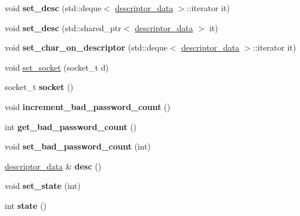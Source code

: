 \begin{DoxyCompactItemize}
void {\bfseries set\+\_\+desc} (std\+::deque$<$ \hyperlink{structmods_1_1descriptor__data}{descriptor\+\_\+data} $>$\+::iterator it)
\item 
\mbox{\label{classmods_1_1player_a573f41de9bcd357412059bf016ebde78}} 
void {\bfseries set\+\_\+desc} (std\+::shared\+\_\+ptr$<$ \hyperlink{structmods_1_1descriptor__data}{descriptor\+\_\+data} $>$ it)
\item 
\mbox{\label{classmods_1_1player_ae0103c5de79432ccac31533bda656fa9}} 
void {\bfseries set\+\_\+char\+\_\+on\+\_\+descriptor} (std\+::deque$<$ \hyperlink{structmods_1_1descriptor__data}{descriptor\+\_\+data} $>$\+::iterator it)
\item 
void \hyperlink{classmods_1_1player_ad5c902bb8d73713f04628ca8988c128a}{set\+\_\+socket} (socket\+\_\+t d)
\item 
\mbox{\label{classmods_1_1player_a07013d414884ecff448cf9de45c50efa}} 
socket\+\_\+t {\bfseries socket} ()
\item 
\mbox{\label{classmods_1_1player_af4656fc7741254fc906d03cda32645ec}} 
void {\bfseries increment\+\_\+bad\+\_\+password\+\_\+count} ()
\item 
\mbox{\label{classmods_1_1player_a7211317b58a2079737faa133b88b2dc8}} 
int {\bfseries get\+\_\+bad\+\_\+password\+\_\+count} ()
\item 
\mbox{\label{classmods_1_1player_a7141d48d5c3738c3c1b8939fb17556d3}} 
void {\bfseries set\+\_\+bad\+\_\+password\+\_\+count} (int)
\item 
\mbox{\label{classmods_1_1player_a6f6ccc5cb85fb90fc6c875e74d91bb79}} 
\hyperlink{structmods_1_1descriptor__data}{descriptor\+\_\+data} \& {\bfseries desc} ()
\item 
\mbox{\label{classmods_1_1player_a7d9ade89f11985d139f8ad5baed27a15}} 
void {\bfseries set\+\_\+state} (int)
\item 
\mbox{\label{classmods_1_1player_ac969ea974d0f1d982a3fdb927e2bae8a}} 
int {\bfseries state} ()
\item 

\end{DoxyCompactItemize}
